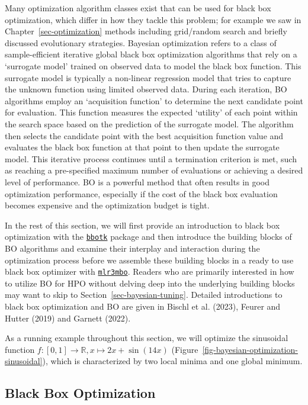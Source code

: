 Many optimization algorithm classes exist that can be used for black box
optimization, which differ in how they tackle this problem; for example
we saw in Chapter~\ref{sec-optimization} methods including grid/random
search and briefly discussed evolutionary strategies. Bayesian
optimization refers to a class of sample-efficient iterative global
black box optimization algorithms that rely on a `surrogate model'
trained on observed data to model the black box function. This surrogate
model is typically a non-linear regression model that tries to capture
the unknown function using limited observed data. During each iteration,
BO algorithms employ an `acquisition function' to determine the next
candidate point for evaluation. This function measures the expected
`utility' of each point within the search space based on the prediction
of the surrogate model. The algorithm then selects the candidate point
with the best acquisition function value and evaluates the black box
function at that point to then update the surrogate model. This
iterative process continues until a termination criterion is met, such
as reaching a pre-specified maximum number of evaluations or achieving a
desired level of performance. BO is a powerful method that often results
in good optimization performance, especially if the cost of the black
box evaluation becomes expensive and the optimization budget is tight.

In the rest of this section, we will first provide an introduction to
black box optimization with the
\href{https://bbotk.mlr-org.com}{\texttt{bbotk}}
package and then introduce the building blocks of BO algorithms and
examine their interplay and interaction during the optimization process
before we assemble these building blocks in a ready to use black box
optimizer with
\href{https://mlr3mbo.mlr-org.com}{\texttt{mlr3mbo}}.
Readers who are primarily interested in how to utilize BO for HPO
without delving deep into the underlying building blocks may want to
skip to Section~\ref{sec-bayesian-tuning}. Detailed introductions to
black box optimization and BO are given in Bischl et al. (2023), Feurer
and Hutter (2019) and Garnett (2022).

As a running example throughout this section, we will optimize the
sinusoidal function
\(f: [0, 1] \rightarrow \mathbb{R}, x \mapsto 2x + \sin(14x)\)
(Figure~\ref{fig-bayesian-optimization-sinusoidal}), which is
characterized by two local minima and one global minimum.

\hypertarget{sec-black-box-optimization}{%
\subsection{Black Box Optimization}\label{sec-black-box-optimization}}

